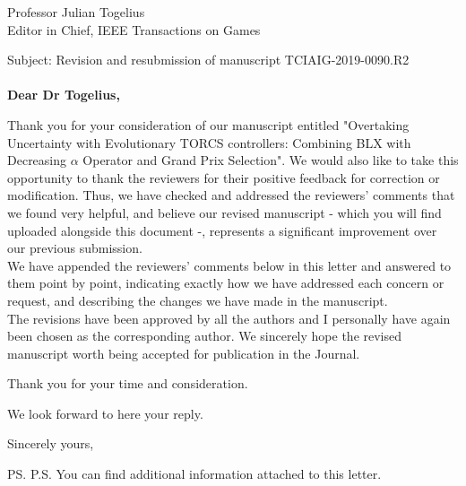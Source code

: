 \documentclass[10pt]{letter} %
\begin{document}

\begin{letter}{Professor Julian Togelius \\ Editor in Chief, IEEE Transactions on Games} %

\opening{Subject: Revision and resubmission of manuscript TCIAIG-2019-0090.R2\\
	\\	
\textbf{Dear Dr Togelius,}}

Thank you for your consideration of our manuscript entitled "Overtaking Uncertainty with Evolutionary TORCS controllers: Combining BLX with Decreasing $\alpha$ Operator and Grand Prix Selection". 
We would also like to take this opportunity to thank the reviewers for their positive feedback for correction or modification. Thus, we have checked and addressed the reviewers' comments that we found very helpful, and believe our revised manuscript - which you will find uploaded alongside this document -, represents a significant improvement over our previous submission. \\


We have appended the reviewers' comments below in this letter and answered to them point by point, indicating exactly how we have addressed each concern or request, and describing the changes we have made in the manuscript.\\
The revisions have been approved by all the authors and I personally have again been chosen as the corresponding author. 
We sincerely hope the revised manuscript worth being accepted for publication in the Journal.

Thank you for your time and consideration.

We look forward to here your reply.

\vspace{2\parskip} %
\closing{Sincerely yours,}
\vspace{2\parskip} %

\ps{P.S. You can find additional information attached to this letter.} %



\end{letter}
\end{document}
